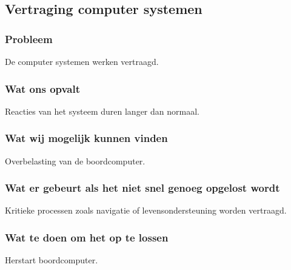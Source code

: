 \subsection{Vertraging computer systemen}

\subsubsection{Probleem}
De computer systemen werken vertraagd.

\subsubsection{Wat ons opvalt}
Reacties van het systeem duren langer dan normaal.

\subsubsection{Wat wij mogelijk kunnen vinden}
Overbelasting van de boordcomputer.

\subsubsection{Wat er gebeurt als het niet snel genoeg opgelost wordt}
Kritieke processen zoals navigatie of levensondersteuning worden vertraagd.

\subsubsection{Wat te doen om het op te lossen}
Herstart boordcomputer.